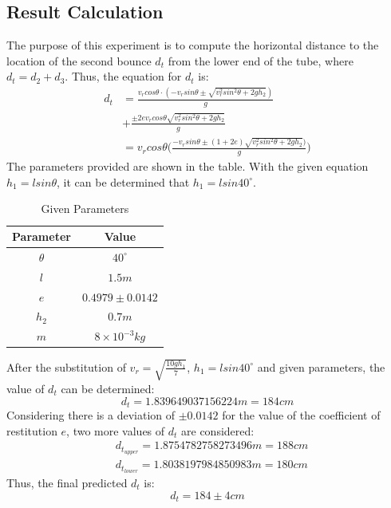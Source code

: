 \documentclass[conference]{IEEEtran}
\begin{document}
        \subsection{Result Calculation}
            The purpose of this experiment is to compute the horizontal distance to the location of the second bounce $d_t$ from the lower end of the tube, where $d_t = d_2 + d_3$. Thus, the equation for $d_t$ is:
            \begin{equation}\label{d_t}
                \begin{aligned}
                    d_t &= \frac{v_rcos\theta \cdot (-v_{r}sin\theta\pm\sqrt{{v^2_{r}sin^2\theta}+2gh_2})}{g}\\&+\frac{\pm2ev_rcos\theta\sqrt{{v^2_{r}sin^2\theta}+2gh_2}}{g} \\
                    &= v_rcos\theta \Big(\frac{-v_rsin\theta\pm(1+2e)\sqrt{{v^2_{r}sin^2\theta}+2gh_2})}{g}\Big)
                \end{aligned}
            \end{equation}
            The parameters provided are shown in the table. With the given equation $h_1 = lsin\theta$, it can be determined that $h_1 = lsin40^\circ$.
            \begin{table}[H]
                \caption {Given Parameters} \label{parameters} 
                \begin{center}
                    \begin{tabular}{cc}
                        \hline
                        Parameter & Value \\
                        \hline
                        $\theta$     & $40^\circ$     \\
                        $l$         & $1.5m$     \\
                        $e$         & $0.4979 \pm 0.0142$     \\
                        $h_2$        & $0.7m$     \\
                        $m$         & $8\times10^{-3}kg$     \\
                        \hline
                    \end{tabular}
                \end{center}
            \end{table}
            After the substitution of  $v_r = \sqrt{\frac{10gh_1}{7}}$, $h_1 = lsin40^\circ$ and given parameters, the value of $d_t$ can be determined:
            $$d_t = 1.839649037156224m = 184cm$$  
            Considering there is a deviation of $\pm 0.0142$ for the value of the coefficient of restitution $e$, two more values of $d_t$ are considered:
            \begin{align}
                &d_{t_{upper}} = 1.8754782758273496m = 188cm \nonumber\\
                &d_{t_{lower}} = 1.8038197984850983m = 180cm \nonumber
            \end{align}
            Thus, the final predicted $d_t$ is:
            \begin{equation}
                d_t = 184 \pm 4cm 
            \end{equation}
\end{document}
